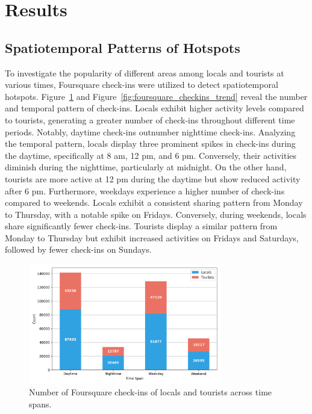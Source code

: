 \documentclass{article}
\theoremstyle{definition}
\theoremstyle{remark}
\begin{document}
\clearpage

\section{Results}

\subsection{Spatiotemporal Patterns of Hotspots}

To investigate the popularity of different areas among locals and tourists at various times, Foursquare check-ins were utilized to detect spatiotemporal hotspots. Figure~\ref{fig:foursquare_checkins_count} and Figure~\ref{fig:foursquare_checkins_trend} reveal the number and temporal pattern of check-ins. Locals exhibit higher activity levels compared to tourists, generating a greater number of check-ins throughout different time periods. Notably, daytime check-ins outnumber nighttime check-ins. Analyzing the temporal pattern, locals display three prominent spikes in check-ins during the daytime, specifically at 8 am, 12 pm, and 6 pm. Conversely, their activities diminish during the nighttime, particularly at midnight. On the other hand, tourists are more active at 12 pm during the daytime but show reduced activity after 6 pm. Furthermore, weekdays experience a higher number of check-ins compared to weekends. Locals exhibit a consistent sharing pattern from Monday to Thursday, with a notable spike on Fridays. Conversely, during weekends, locals share significantly fewer check-ins. Tourists display a similar pattern from Monday to Thursday but exhibit increased activities on Fridays and Saturdays, followed by fewer check-ins on Sundays.

\begin{figure}[!h]
\centering
\includegraphics[width=0.75\textwidth]{figures/foursquare_checkins_count.png}
\caption{\label{fig:foursquare_checkins_count}Number of Foursquare check-ins of locals and tourists across time spans.}
\end{figure}
\end{document}
